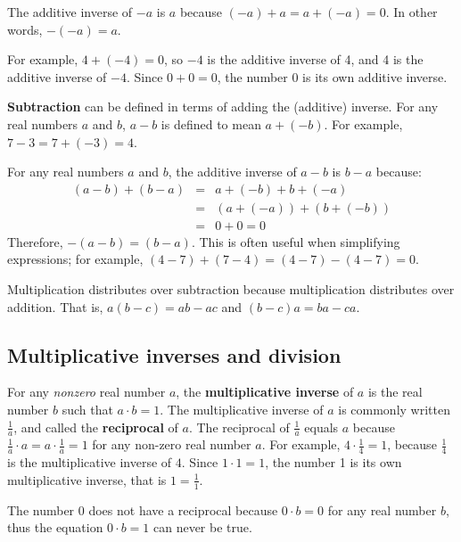 \documentclass[11pt]{book}               %
\begin{document}
The additive inverse of $-a$ is $a$ because $(-a) + a = a + (-a) = 0$.
In other words, $-(-a) = a$.

For example, $4 + (-4) = 0$, so $-4$ is the additive inverse of 4, and  
4 is the additive inverse of $-4$.
Since $0 + 0 = 0$, the number 0 is its own additive inverse.

\textbf{Subtraction} can be defined in terms of adding the (additive) inverse. 
For any real numbers $a$ and $b$, %
$a - b$ is defined to mean $a + (-b)$.
For example, $7 - 3 = 7 + (-3) = 4$.

For any real numbers $a$ and $b$, the additive inverse of $a-b$ is  $b-a$ because:
\begin{eqnarray*}
(a - b) + (b - a) & = & a + (-b) + b + (-a) \\
& = & (a + (-a)) + (b + (-b))\\
& = &  0 + 0 = 0
\end{eqnarray*}
Therefore, $-(a - b) = (b-a)$. This is often useful when simplifying expressions; for example, $(4-7)+(7-4)=(4-7)-(4-7)=0$.

Multiplication distributes over subtraction because multiplication distributes over addition.
That is, $a (b - c) = ab - ac$ and $(b - c) a = ba - ca$.

\subsection{Multiplicative inverses and division}

For any \emph{nonzero} real number $a$, the \textbf{multiplicative inverse} of $a$ is the real number $b$
such that $a \cdot b = 1$.
The multiplicative inverse of $a$ is commonly written $\frac{1}{a}$, and called the \textbf{reciprocal} of $a$. 
The reciprocal of $\frac{1}{a}$ equals $a$ because $\frac{1}{a} \cdot a = a \cdot \frac{1}{a} = 1$ for any non-zero
real number $a$.  
For example, $4\cdot\frac{1}{4} = 1$, because $\frac{1}{4}$ is the multiplicative inverse of $4$. 
Since $1 \cdot 1 = 1$, the number 1 is its own multiplicative inverse, that is $1 = \frac{1}{1}$.

The number 0 does not have a reciprocal because $0 \cdot b = 0$ for any real number $b$,
thus the equation $0 \cdot b = 1$ can never be true.
\end{document}
